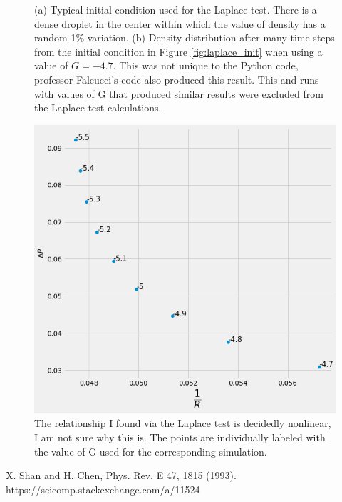 \documentclass[]{article}
\begin{document}
\begin{figure}
\begin{subfigure}[t]{.49\textwidth}
	\caption{}
	\label{fig:muphase_G_46.png}
\end{subfigure}
\caption{(a) Typical initial condition used for the Laplace test. There is a dense droplet in the center within which the value of density has a random 1\% variation.  (b) Density distribution after many time steps from the initial condition in Figure \ref{fig:laplace_init} when using a value of $G=-4.7$. This was not unique to the Python code, professor Falcucci's code also produced this result. This and runs with values of G that produced similar results were excluded from the Laplace test calculations.}
\end{figure}

\begin{figure}
	\centering
	\includegraphics[width=.7\textwidth]{figures/laplace_radInit21.png}
	\caption{The relationship I found via the Laplace test is decidedly nonlinear, I am not sure why this is. The points are individually labeled with the value of G used for the corresponding simulation.}
	\label{fig:laplace_test}
\end{figure}
\begin{thebibliography}{99}
	 X. Shan and H. Chen, Phys. Rev. E 47, 1815 (1993).
	 https://scicomp.stackexchange.com/a/11524

\end{thebibliography}
\end{document}

